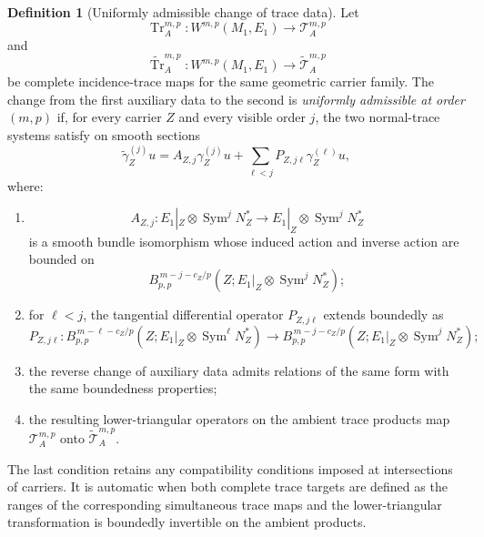 \documentclass[11pt]{article}
\theoremstyle{plain}
\theoremstyle{definition}
\newtheorem{definition}[theorem]{Definition}
\begin{document}
\begin{definition}[Uniformly admissible change of trace data]
\label{def:uniformly-admissible-trace-change}
Let
\[
  \operatorname{Tr}_A^{m,p}:
  W^{m,p}(M_1,E_1)
  \longrightarrow
  \mathcal T_A^{m,p}
\]
and
\[
  \widetilde{\operatorname{Tr}}_A^{m,p}:
  W^{m,p}(M_1,E_1)
  \longrightarrow
  \widetilde{\mathcal T}_A^{m,p}
\]
be complete incidence-trace maps for the same geometric carrier
family. The change from the first auxiliary data to the second is
\emph{uniformly admissible at order \((m,p)\)} if, for every carrier
\(Z\) and every visible order \(j\), the two normal-trace systems
satisfy on smooth sections
\[
  \widetilde\gamma_Z^{(j)}u
  =
  A_{Z,j}\gamma_Z^{(j)}u
  +
  \sum_{\ell<j}
  P_{Z,j\ell}\gamma_Z^{(\ell)}u,
\]
where:

\begin{enumerate}[label=\textup{(\roman*)}]
  \item
        \[
          A_{Z,j}:
          E_1|_Z\otimes\operatorname{Sym}^jN_Z^*
          \longrightarrow
          E_1|_Z\otimes\operatorname{Sym}^jN_Z^*
        \]
        is a smooth bundle isomorphism whose induced action and inverse
        action are bounded on
        \[
          B_{p,p}^{\,m-j-c_Z/p}
          \left(
            Z;
            E_1|_Z\otimes\operatorname{Sym}^jN_Z^*
          \right);
        \]

  \item for \(\ell<j\), the tangential differential operator
        \(P_{Z,j\ell}\) extends boundedly as
        \[
          P_{Z,j\ell}:
          B_{p,p}^{\,m-\ell-c_Z/p}
          \left(
            Z;
            E_1|_Z\otimes\operatorname{Sym}^\ell N_Z^*
          \right)
          \longrightarrow
          B_{p,p}^{\,m-j-c_Z/p}
          \left(
            Z;
            E_1|_Z\otimes\operatorname{Sym}^j N_Z^*
          \right);
        \]

  \item the reverse change of auxiliary data admits relations of the
        same form with the same boundedness properties;

  \item the resulting lower-triangular operators on the ambient trace
        products map \(\mathcal T_A^{m,p}\) onto
        \(\widetilde{\mathcal T}_A^{m,p}\).
\end{enumerate}
\end{definition}

The last condition retains any compatibility conditions imposed at
intersections of carriers. It is automatic when both complete trace
targets are defined as the ranges of the corresponding simultaneous
trace maps and the lower-triangular transformation is boundedly
invertible on the ambient products.
\end{document}
